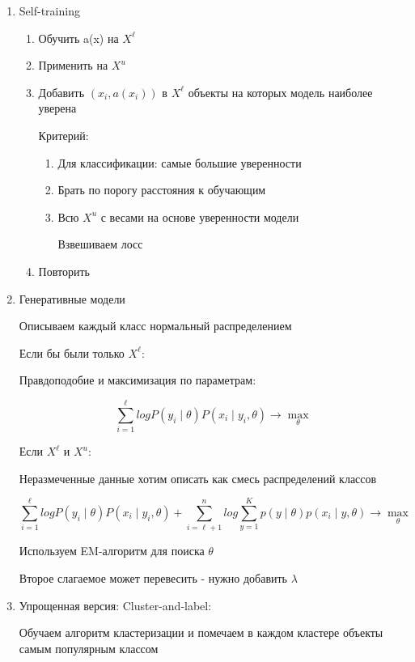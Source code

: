 \documentclass[a4paper, 12pt]{article}
\begin{document}
\begin{enumerate}
    \item Self-training
    
    \begin{enumerate}
        \item Обучить a(x) на $X^{\ell}$
        \item Применить на $X^u$
        \item Добавить $(x_i, a(x_i))$ в $X^{\ell}$ объекты на 
        которых модель наиболее уверена

        Критерий: 
        \begin{enumerate}
            \item Для классификации: самые большие уверенности
            \item Брать по порогу расстояния к обучающим
            \item Всю $X^u$ с весами на основе уверенности модели
            
            Взвешиваем лосс
        \end{enumerate}

        \item Повторить
    \end{enumerate}
    \item Генеративные модели
    
    Описываем каждый класс нормальный распределением

    Если бы были только $X^{\ell}$:

    Правдоподобие и максимизация по параметрам:

    \[\sum_{i = 1}^{\ell} logP(y_i \mid \theta)P(x_i \mid y_i, \theta) \rightarrow \max_{\theta}\]

    Если $X^{\ell}$ и $X^{u}$:

    Неразмеченные данные хотим описать как смесь распределений классов

    \[\sum_{i = 1}^{\ell} logP(y_i \mid \theta)P(x_i \mid y_i, \theta) +
    \sum_{i = \ell + 1}^n log \sum_{y = 1}^K p(y \mid \theta)p(x_i \mid y, \theta) 
    \rightarrow \max_{\theta}\]

    Используем EM-алгоритм для поиска $\theta$

    Второе слагаемое может перевесить - нужно добавить $\lambda$

    \item Упрощенная версия: Cluster-and-label:
    
    Обучаем алгоритм кластеризации и помечаем в каждом кластере
    объекты самым популярным классом


\end{enumerate}
\end{document}
